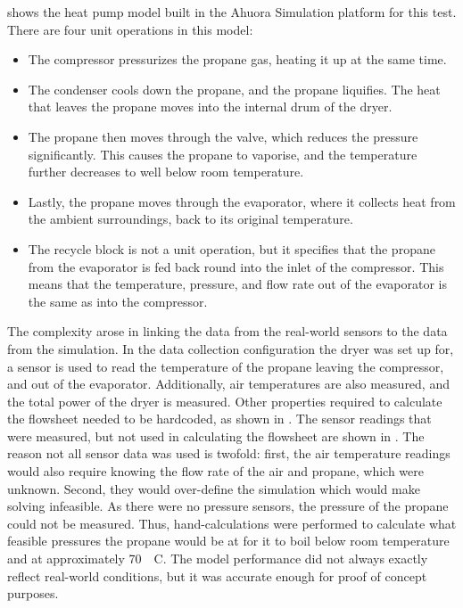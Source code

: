  shows the heat pump model built in the Ahuora Simulation platform for this test. There are four unit operations in this model:

\begin{itemize}
    \item The compressor pressurizes the propane gas, heating it up at the same time. 
    \item The condenser cools down the propane, and the propane liquifies. The heat that leaves the propane moves into the internal drum of the dryer.
    \item The propane then moves through the valve, which reduces the pressure significantly. This causes the propane to vaporise, and the temperature further decreases to well below room temperature.
    \item Lastly, the propane moves through the evaporator, where it collects heat from the ambient surroundings, back to its original temperature.
    \item The recycle block is not a unit operation, but it specifies that the propane from the evaporator is fed back round into the inlet of the compressor. This means that the temperature, pressure, and flow rate out of the evaporator is the same as into the compressor.
\end{itemize}

The complexity arose in linking the data from the real-world sensors to the data from the simulation. In the data collection configuration the dryer was set up for, a sensor is used to read the temperature of the propane leaving the compressor, and out of the evaporator. Additionally, air temperatures are also measured, and the total power of the dryer is measured. Other properties required to calculate the flowsheet needed to be hardcoded, as shown in . 
The sensor readings that were measured, but not used in calculating the flowsheet are shown in . The reason not all sensor data was used is twofold: first, the air temperature readings would also require knowing the flow rate of the air and propane, which were unknown. Second, they would over-define the simulation which would make solving infeasible. 
As there were no pressure sensors, the pressure of the propane could not be measured. Thus, hand-calculations were performed to calculate what feasible pressures the propane would be at for it to boil below room temperature and at approximately 70~\degree~C. The model performance did not always exactly reflect real-world conditions, but it was accurate enough for proof of concept purposes.


